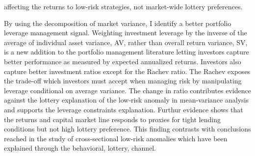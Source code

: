 affecting the returns to low-risk strategies, not market-wide lottery preferences. 


By using the decomposition of market variance, I identify a better portfolio leverage management signal. Weighting investment leverage by the inverse of the average of individual asset variance, AV, rather than overall return variance, SV, is a new addition to the portfolio management literature letting investors capture better performance as measured by expected annualized returns. Investors also capture better investment ratios except for the Rachev ratio. The Rachev exposes the trade-off which investors must accept when managing risk by manipulating leverage conditional on average variance. The change in ratio contributes evidence against the lottery explanation of the low-risk anomaly in mean-variance analysis and supports the leverage constraints explanation. Furthur evidence shows that the returns and capital market line responds to proxies for tight lending conditions but not high lottery preference. This finding contrasts with conclusions reached in the study of cross-sectional low-risk anomalies which have been explained through the behavioral, lottery, channel.%

